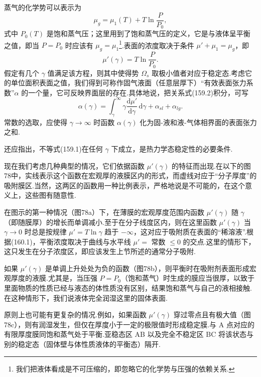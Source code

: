 蒸气的化学势可以表示为
\begin{equation*}
  \mu_g=\mu_1(T)+T\ln\frac{P}{P_0},
\end{equation*}
式中 $P_0(T)$ 是饱和蒸气压；这里用到了饱和蒸气压的定义，它是与液体呈平衡之值，即当 $P=P_0$ 时应该有 $\mu_g=\mu_1$\footnote{我们把液体看成是不可压缩的，即忽略它的化学势与压强的依赖关系.}.表面的浓度取决于条件 $\mu'+\mu_1=\mu_g$，即
\begin{equation}
  \mu'(\gamma)=T\ln\frac{P}{P_0}.
\end{equation}
假定有几个 $\gamma$ 值满足该方程，则其中使得势 $\Omega_s$ 取极小值者对应于稳定态.考虑它的单位面积表面之值，我们得到可称作固气液面（任意层厚下）“有效表面张力系数”$\alpha$ 的一个量，它可反映界面层的存在.具体地说，把关系式(159.2)积分，可写
\begin{equation}
  \alpha(\gamma)=\int_{\gamma}^{\infty}\gamma
  \frac{\mathrm{d}\mu'}{\mathrm{d}\gamma}\,\mathrm{d}\gamma
  +\alpha_{sl}+\alpha_{lg}.
\end{equation}
常数的选取，应使得 $\gamma\to\infty$ 时函数 $\alpha(\gamma)$ 化为固-液和液-气体相界面的表面张力之和.

还应指出，不等式(159.1)在任何 $\gamma$ 下成立，是热力学态稳定性的必要条件.

现在我们考虑几种典型的情况，它们依据函数 $\mu'(\gamma)$ 的特征而出现.在以下的图78中，实线表示这个函数在宏观厚的液膜区内的形式，而虚线对应于“分子厚度”的吸附膜区.当然，这两区的函数用一种比例表示，严格地说是不可能的，在这个意义上，这些图有随意性.

在图示的第一种情况（图78a）下，在薄膜的宏观厚度范围内函数 $\mu'(\gamma)$ 随 $\gamma$（即随膜厚）的增长而单调减小.至于在分子线度区内，则在这里函数 $\mu'(\gamma)$ 当 $\gamma\to0$ 时总是按规律 $\mu'=T\ln\gamma$ 趋于 $-\infty$，这对应于吸附质在表面的“稀溶液”.根据(160.1)，平衡浓度取决于曲线与水平线 $\mu'=$ 常数 $\leqslant0$ 的交点.这里的情形下，这只发生在分子浓度区，即应该发生上节所述的通常分子吸附.

如果 $\mu'(\gamma)$ 是单调上升处处为负的函数（图78b），则平衡时在吸附剂表面形成宏观厚度的液膜.尤其是，当压强 $P=P_0$（饱和蒸气）时生成的膜应当很厚，以致于里面物质的性质已经与液态的体性质没有区别，结果饱和蒸气与自己的液相接触.在这种情形下，我们说液体完全润湿这里的固体表面.

原则上也可能有更复杂的情况.例如，如果函数 $\mu'(\gamma)$ 穿过零点且有极大值（图78c），则有润湿发生，但仅在厚度小于一定的极限值时形成稳定膜.与 A 点对应的有限厚度膜同饱和蒸气处于平衡.亚稳态区 AB 以及完全不稳定区 BC 将该状态与别的稳定态（固体壁与体性质液体的平衡态）隔开.

